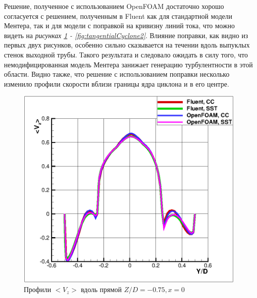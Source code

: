 Решение, полученное с использованием OpenFOAM достаточно хорошо согласуется с решением, полученным в Fluent как для стандартной модели Ментера, так и для модели с поправкой на кривизну линий тока, что можно видеть на \textit{рисунках \ref{fig:axialCyclone} - \ref{fig:tangentialCyclone2}}. Влияние поправки, как видно из первых двух рисунков, особенно сильно сказывается на течении вдоль выпуклых стенок выходной трубы. Такого результата и следовало ожидать в силу того, что немодифицированная модель Ментера занижает генерацию турбулентности в этой области. Видно также, что решение с использованием поправки несколько изменило профили скорости вблизи границы ядра циклона и в его центре.
\newpage
 \begin{figure}[h]
	\begin{minipage}{0.475\linewidth}
		\includegraphics[scale=0.66]{axialCyclone}
		\caption{Профили $<V_{z}>$ вдоль прямой $Z/D=-0.75, x=0$}
		\label{fig:axialCyclone}
	\end{minipage}
	\hspace{0.5em}
	\begin{minipage}{0.475\linewidth}

\end{minipage}
\end{figure}
